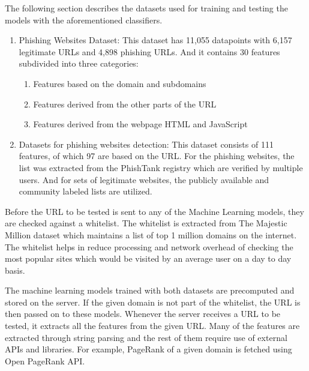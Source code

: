 \documentclass[conference]{IEEEtran}
\begin{document}
\par The following section describes the datasets used for training and testing the models with the aforementioned classifiers.
\begin{enumerate}
    \item Phishing Websites Dataset\cite{UCIDataset}:
          This dataset has 11,055 datapoints with 6,157 legitimate URLs and 4,898 phishing URLs.
          And it contains 30 features subdivided into three categories:
          \begin{enumerate}
              \item Features based on the domain and subdomains
              \item Features derived from the other parts of the URL
              \item Features derived from the webpage HTML and JavaScript
          \end{enumerate}
    \item Datasets for phishing websites detection\cite{GregaDataset}:
          This dataset consists of 111 features, of which 97 are based on the URL.
          For the phishing websites, the list was extracted from the PhishTank registry which are verified by multiple users.
          And for sets of legitimate websites, the publicly available and community labeled lists are utilized\cite{citizenlablists}.
\end{enumerate}

\par Before the URL to be tested is sent to any of the Machine Learning models, they are checked against a whitelist.
The whitelist is extracted from The Majestic Million dataset\cite{MajesticMillion} which maintains a list of top 1 million domains on the internet.
The whitelist helps in reduce processing and network overhead of checking the most popular sites which would be visited by an average user on a day to day basis.

\par The machine learning models trained with both datasets are precomputed and stored on the server.
If the given domain is not part of the whitelist, the URL is then passed on to these models.
Whenever the server receives a URL to be tested, it extracts all the features from the given URL.
Many of the features are extracted through string parsing and the rest of them require use of external APIs and libraries.
For example, PageRank of a given domain is fetched using Open PageRank API\cite{OpenPageRank}.
\end{document}
